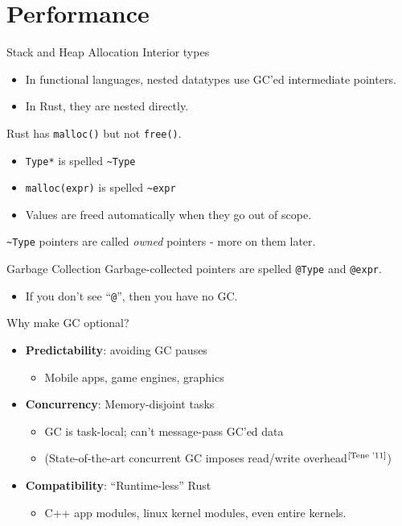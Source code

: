 \documentclass[xcolor=dvipsnames]{beamer}
\begin{document}
\section{Performance}


\begin{frame}{Stack and Heap Allocation}
	Interior types
	\begin{itemize}
		\item In functional languages, nested datatypes use GC'ed intermediate pointers.
		\item In Rust, they are nested directly.
	\end{itemize}
	\pause
	\linegap

	Rust has \texttt{malloc()} but not \texttt{free()}.
	\begin{itemize}
		\item \texttt{Type*} is spelled \texttt{\textasciitilde{}Type}
		\item \texttt{malloc(expr)} is spelled \texttt{\textasciitilde{}expr}
		\item Values are freed automatically when they go out of scope.
	\end{itemize}
	\pause
	\linegap
	\texttt{\textasciitilde{}Type} pointers are called {\em owned} pointers - more on them later.
\end{frame}

\begin{frame}{Garbage Collection}
	Garbage-collected pointers are spelled \texttt{@Type} and \texttt{@expr}.
	\begin{itemize}
		\item If you don't see ``\texttt{@}'', then you have no GC.
	\end{itemize}
	\pause
	\linegap

	Why make GC optional?
	\begin{itemize}
		\item \textbf{Predictability}: avoiding GC pauses
		\begin{itemize}
			\item Mobile apps, game engines, graphics
		\end{itemize}
		\item \textbf{Concurrency}: Memory-disjoint tasks
		\begin{itemize}
			\item GC is task-local; can't message-pass GC'ed data
			\item (State-of-the-art concurrent GC imposes read/write overhead$^{\small \text{[Tene '11]}}$)
		\end{itemize}
		\item \textbf{Compatibility}: ``Runtime-less'' Rust
		\begin{itemize}
			\item C++ app modules, linux kernel modules, even entire kernels.
		\end{itemize}
	\end{itemize}
\end{frame}
\end{document}
